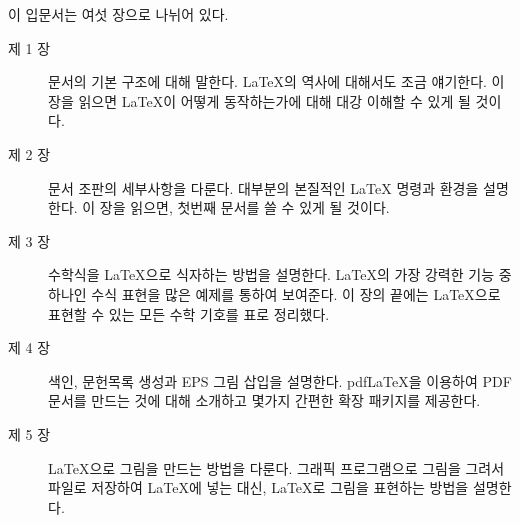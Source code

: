\bigskip
\noindent 이 입문서는 여섯 장으로 나뉘어 있다.
\begin{description}
\item[제 1 장] \LaTeXe{} 문서의 기본 구조에 대해 말한다.
 \LaTeX{}의 역사에 대해서도 조금 얘기한다. 
  이 장을 읽으면 \LaTeX 이 어떻게 동작하는가에 대해 대강 이해할 수 있게 될 것이다.

\item[제 2 장] 문서 조판의 세부사항을 다룬다.
대부분의 본질적인 \LaTeX{} 명령과 환경을 설명한다.
이 장을 읽으면, 첫번째 문서를 쓸 수 있게 될 것이다. 
 
\item[제 3 장] 수학식을 \LaTeX 으로  식자하는 방법을 설명한다.
\LaTeX 의 가장 강력한 기능 중 하나인 수식 표현을 많은 예제를 통하여 보여준다.
이 장의 끝에는 \LaTeX 으로 표현할 수 있는 모든 수학 기호를 표로 정리했다.

\item[제 4 장] 색인, 문헌목록 생성과 EPS 그림 삽입을 설명한다.
pdf\LaTeX 을 이용하여 PDF 문서를 만드는 것에 대해 소개하고  몇가지 간편한 확장 패키지를 제공한다.

\item[제 5 장] \LaTeX 으로 그림을 만드는 방법을 다룬다.
그래픽 프로그램으로 그림을 그려서 파일로 저장하여 \LaTeX 에 넣는 대신, \LaTeX 로 그림을 표현하는
방법을 설명한다.


\end{description}
